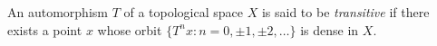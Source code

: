 An automorphism $T$ of a topological space $X$ is said to be \textit{transitive} if there exists a point $x$ whose orbit $\{T^n x : n = 0, \pm 1, \pm 2, \ldots\}$ is dense in $X$.

